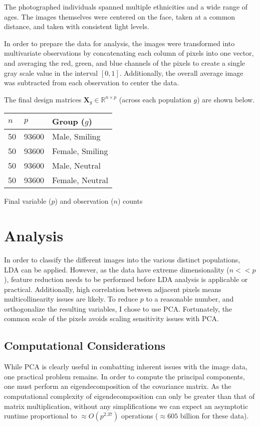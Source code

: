 \documentclass{article}
\begin{document}
\begin{multicols}{2}
  The photographed individuals spanned multiple ethnicities and a wide range of ages. The images themselves were centered on the face, taken at a common distance, and taken with consistent light levels.
  
  In order to prepare the data for analysis, the images were transformed into multivariate observations by concatenating each column of pixels into one vector, and averaging the red, green, and blue channels of the pixels to create a single gray scale value in the interval $[0,1]$. Additionally, the overall average image was subtracted from each observation to center the data.
  
  The final design matrices $\bm{X}_{g} \in \mathbb{R}^{n\times p}$ (across each population $g$) are shown below. 
  
  \vspace{2em}
  
  \noindent
  \begin{minipage}{\columnwidth}
    \makeatletter
    \newcommand{\@captype}{table}
    \makeatother
    \centering
    \begin{tabular}{lll}
    \hline
    $n$ & $p$ & Group ($g$) \\
    \hline
     50  & 93600 & Male, Smiling \\
     50  & 93600 & Female, Smiling \\
     50  & 93600 & Male, Neutral \\
     50  & 93600 & Female, Neutral \\
    \hline
    \end{tabular}
    \caption{Final variable ($p$) and observation ($n$) counts}
  \end{minipage}

  
  \section{Analysis}
  In order to classify the different images into the various distinct populations, LDA can be applied. However, as the data have extreme dimensionality ($n << p$), feature reduction needs to be performed before LDA analysis is applicable or practical. Additionally, high correlation between adjacent pixels means multicollinearity issues are likely. To reduce $p$ to a reasonable number, and orthogonalize the resulting variables, I chose to use PCA. Fortunately, the common scale of the pixels avoids scaling sensitivity issues with PCA.
  
  \subsection{Computational Considerations}
  While PCA is clearly useful in combatting inherent issues with the image data, one practical problem remains. In order to compute the principal components, one must perform an eigendecomposition of the covariance matrix. As the computational complexity of eigendecomposition can only be greater than that of matrix multiplication, without any simplifications we can expect an asymptotic runtime \cite{stothers2010complexity} proportional to $\approx O(p^{2.37})$ operations  ($\approx 605$ billion for these data).
  

\end{multicols}
\end{document}
